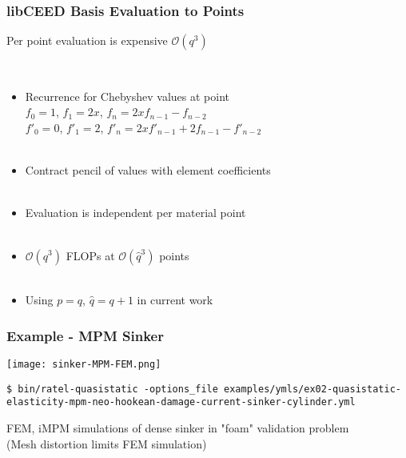 \documentclass{beamer}
\begin{document}
\begin{frame}
\begin{center}
\frametitle{libCEED Basis Evaluation to Points}

Per point evaluation is expensive $\mathcal{O} \left( q^3 \right)$

~\\

\begin{itemize}

\item Recurrence for Chebyshev values at point\\

$f_0 = 1$, $f_1 = 2 x$, $f_n = 2 x f_{n - 1} - f_{n - 2}$\\

$f'_0 = 0$, $f'_1 = 2$, \hspace{0.7mm} $f'_n = 2 x f'_{n - 1} + 2 f_{n - 1} - f'_{n - 2}$\\

~\\

\item Contract pencil of values with element coefficients\\

~\\

\item Evaluation is independent per material point\\

~\\

\item $\mathcal{O} \left( q^3 \right)$ FLOPs at $\mathcal{O} \left( \hat{q}^3 \right)$ points\\

~\\

\item Using $p = q$, $\hat{q} = q + 1$ in current work\\

\end{itemize}

\end{center}
\end{frame}


\begin{frame}[fragile]
\begin{center}
\frametitle{Example - MPM Sinker}

\texttt{[image: sinker-MPM-FEM.png]}

{\tiny
\begin{lstlisting}
$ bin/ratel-quasistatic -options_file examples/ymls/ex02-quasistatic-elasticity-mpm-neo-hookean-damage-current-sinker-cylinder.yml
\end{lstlisting}
}

FEM, iMPM simulations of dense sinker in "foam" validation problem\\

(Mesh distortion limits FEM simulation)

\end{center}
\end{frame}
\end{document}
